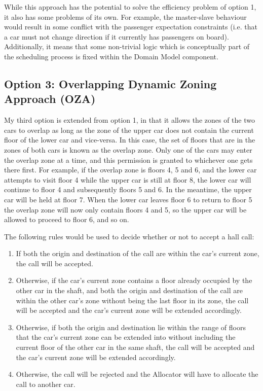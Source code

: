 \documentclass{UoYCSproject}
\begin{document}
While this approach has the potential to solve the efficiency problem of option 1, it also has some problems of its own.  For example, the master-slave behaviour would result in some conflict with the passenger expectation constraints (i.e. that a car must not change direction if it currently has passengers on board).  Additionally, it means that some non-trivial logic which is conceptually part of the scheduling process is fixed within the Domain Model component.

\subsection{Option 3: Overlapping Dynamic Zoning Approach (OZA)}

My third option is extended from option 1, in that it allows the zones of the two cars to overlap as long as the zone of the upper car does not contain the current floor of the lower car and vice-versa.  In this case, the set of floors that are in the zones of both cars is known as the overlap zone.  Only one of the cars may enter the overlap zone at a time, and this permission is granted to whichever one gets there first.  For example, if the overlap zone is floors 4, 5 and 6, and the lower car attempts to visit floor 4 while the upper car is still at floor 8, the lower car will continue to floor 4 and subsequently floors 5 and 6.  In the meantime, the upper car will be held at floor 7.  When the lower car leaves floor 6 to return to floor 5 the overlap zone will now only contain floors 4 and 5, so the upper car will be allowed to proceed to floor 6, and so on.

The following rules would be used to decide whether or not to accept a hall call:
\begin{enumerate}
	\item If both the origin and destination of the call are within the car's current zone, the call will be accepted.
	\item Otherwise, if the car's current zone contains a floor already occupied by the other car in the shaft, and both the origin and destination of the call are within the other car's zone without being the last floor in its zone, the call will be accepted and the car's current zone will be extended accordingly.
	\item Otherwise, if both the origin and destination lie within the range of floors that the car's current zone can be extended into without including the current floor of the other car in the same shaft, the call will be accepted and the car's current zone will be extended accordingly.
	\item Otherwise, the call will be rejected and the Allocator will have to allocate the call to another car.
\end{enumerate}
\end{document}
